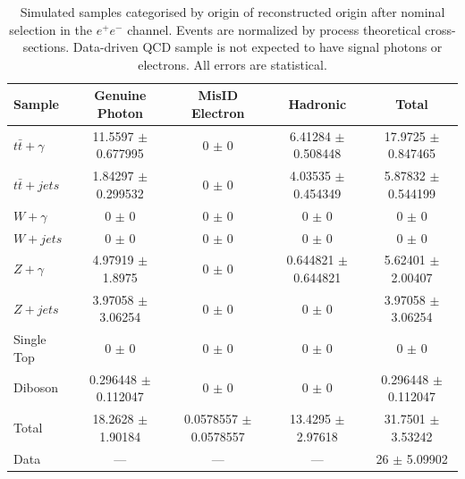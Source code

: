 \begin{table}
\begin{center}
\begin{tabular}{l|ccc|c}
\hline
	\textbf{Sample} & \textbf{Genuine Photon} & \textbf{MisID Electron} & \textbf{Hadronic} & \textbf{Total} \\
\hline
$t\bar{t}+\gamma$  & 11.5597 $\pm$ 0.677995 & 0 $\pm$ 0 & 6.41284 $\pm$ 0.508448 & 17.9725 $\pm$ 0.847465 \\
$t\bar{t}+jets$  & 1.84297 $\pm$ 0.299532 & 0 $\pm$ 0 & 4.03535 $\pm$ 0.454349 & 5.87832 $\pm$ 0.544199 \\
$W+\gamma$  & 0 $\pm$ 0 & 0 $\pm$ 0 & 0 $\pm$ 0 & 0 $\pm$ 0 \\
$W+jets$  & 0 $\pm$ 0 & 0 $\pm$ 0 & 0 $\pm$ 0 & 0 $\pm$ 0 \\
$Z+\gamma$  & 4.97919 $\pm$ 1.8975 & 0 $\pm$ 0 & 0.644821 $\pm$ 0.644821 & 5.62401 $\pm$ 2.00407 \\
$Z+jets$  & 3.97058 $\pm$ 3.06254 & 0 $\pm$ 0 & 0 $\pm$ 0 & 3.97058 $\pm$ 3.06254 \\
Single Top  & 0 $\pm$ 0 & 0 $\pm$ 0 & 0 $\pm$ 0 & 0 $\pm$ 0 \\
Diboson  & 0.296448 $\pm$ 0.112047 & 0 $\pm$ 0 & 0 $\pm$ 0 & 0.296448 $\pm$ 0.112047 \\
\hline
Total  & 18.2628 $\pm$ 1.90184 & 0.0578557 $\pm$ 0.0578557 & 13.4295 $\pm$ 2.97618 & 31.7501 $\pm$ 3.53242 \\
Data  & --- & --- & --- & 26 $\pm$ 5.09902 \\
\hline	
\end{tabular}
\end{center}
\caption{Simulated samples categorised by origin of reconstructed origin after nominal selection in the $e^+e^-$ channel. Events are normalized by process theoretical cross-sections. Data-driven QCD sample is not expected to have signal photons or electrons. All errors are statistical.}
\label{tab-SigPhotonsEE}
\end{table}	

